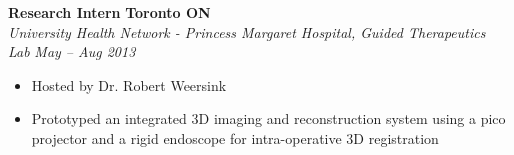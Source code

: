       \vspace{\interlist}
      \textbf{Research Intern}
      \hfill
      \textbf{Toronto ON}\\
      \textit{University Health Network - Princess Margaret Hospital, Guided Therapeutics Lab}
      \hfill
      \textit{May -- Aug 2013}
      \begin{itemize}
        \setlength\itemsep{0.2em}
        \item Hosted by Dr. Robert Weersink
        \item Prototyped an integrated 3D imaging and reconstruction system using a pico projector and a rigid endoscope for intra-operative 3D registration
      \end{itemize}
      \vspace{\interlist}
